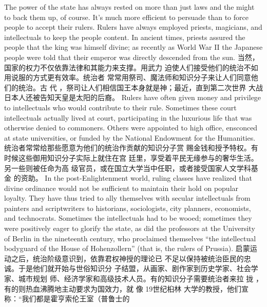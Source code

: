 \begin{paracol}{2}
The power of the state has always rested on more than just laws
and the might to back them up, of course. It's much more efficient to persuade than to force people to accept their rulers.
Rulers have always employed priests, magicians, and intellectuals to keep the people content. In ancient times, priests assured
the people that the king was himself divine; as recently as
World War II the Japanese people were told that their emperor
was directly descended from the sun.
\switchcolumn
当然，国家的权力不仅依靠法律和其能力来支撑。用武力
迫使人们接受他们的统治不如用说服的方式更有效率。统治者
常常用祭司、魔法师和知识分子来让人们同意他们的统治。古
代 ，祭司让人们相信国王本身就是神；最近，直到第二次世界
大战日本人还被告知天皇是太阳的后裔。
\switchcolumn*
Rulers have often given money and privilege to intellectuals
who would contribute to their rule. Sometimes these court intellectuals actually lived at court, participating in the luxurious
life that was otherwise denied to commoners. Others were appointed to high office, ensconced at state universities, or funded
by the National Endowment for the Humanities.
\switchcolumn
统治者常常给那些愿意为他们的统治作贡献的知识分子赏
赐金钱和授予特权。有时候这些御用知识分子实际上就住在宫
廷里，享受着平民无缘参与的奢华生活。另一些则被任命为高
级官员，或在国立大学当中任职，或者接受国家人文学科基金
的资助。
\switchcolumn*
In the post-Enlightenment world, ruling classes have realized that divine ordinance would not be sufficient to maintain
their hold on popular loyalty. They have thus tried to ally themselves with secular intellectuals from painters and scriptwriters
to historians, sociologists, city planners, economists, and technocrats. Sometimes the intellectuals had to be wooed; sometimes they were positively eager to glorify the state, as did the
professors at the University of Berlin in the nineteenth century,
who proclaimed themselves ``the intellectual bodyguard of the
House of Hohenzollern'' (that is, the rulers of Prussia).
\switchcolumn
启蒙运动之后，统治阶级意识到，依靠君权神授的理论已
不足以保持被统治臣民的忠诚。于是他们就开始与世俗知识分
子结盟，从画家、剧作家到历史学家、社会学家、城市规划
师、经济学家和高级技术人员。有的知识分子需要统治者来拉
拢 ，有的则热血沸腾地主动要求为国效力，就 像 19世纪桕林
大学的教授，他们宣称：“我们都是霍亨索伦王室（普鲁士的

\end{paracol}
